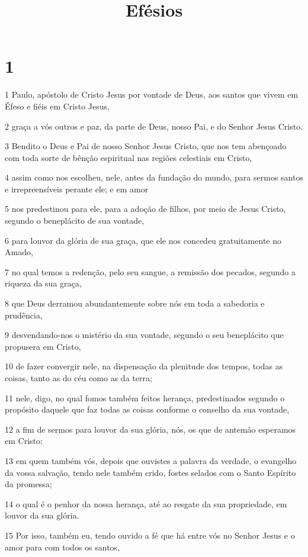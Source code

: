 

\title{Efésios}


\chapter{1}

\par 1 Paulo, apóstolo de Cristo Jesus por vontade de Deus, aos santos que vivem em Éfeso e fiéis em Cristo Jesus,
\par 2 graça a vós outros e paz, da parte de Deus, nosso Pai, e do Senhor Jesus Cristo.
\par 3 Bendito o Deus e Pai de nosso Senhor Jesus Cristo, que nos tem abençoado com toda sorte de bênção espiritual nas regiões celestiais em Cristo,
\par 4 assim como nos escolheu, nele, antes da fundação do mundo, para sermos santos e irrepreensíveis perante ele; e em amor
\par 5 nos predestinou para ele, para a adoção de filhos, por meio de Jesus Cristo, segundo o beneplácito de sua vontade,
\par 6 para louvor da glória de sua graça, que ele nos concedeu gratuitamente no Amado,
\par 7 no qual temos a redenção, pelo seu sangue, a remissão dos pecados, segundo a riqueza da sua graça,
\par 8 que Deus derramou abundantemente sobre nós em toda a sabedoria e prudência,
\par 9 desvendando-nos o mistério da sua vontade, segundo o seu beneplácito que propusera em Cristo,
\par 10 de fazer convergir nele, na dispensação da plenitude dos tempos, todas as coisas, tanto as do céu como as da terra;
\par 11 nele, digo, no qual fomos também feitos herança, predestinados segundo o propósito daquele que faz todas as coisas conforme o conselho da sua vontade,
\par 12 a fim de sermos para louvor da sua glória, nós, os que de antemão esperamos em Cristo;
\par 13 em quem também vós, depois que ouvistes a palavra da verdade, o evangelho da vossa salvação, tendo nele também crido, fostes selados com o Santo Espírito da promessa;
\par 14 o qual é o penhor da nossa herança, até ao resgate da sua propriedade, em louvor da sua glória.
\par 15 Por isso, também eu, tendo ouvido a fé que há entre vós no Senhor Jesus e o amor para com todos os santos,
